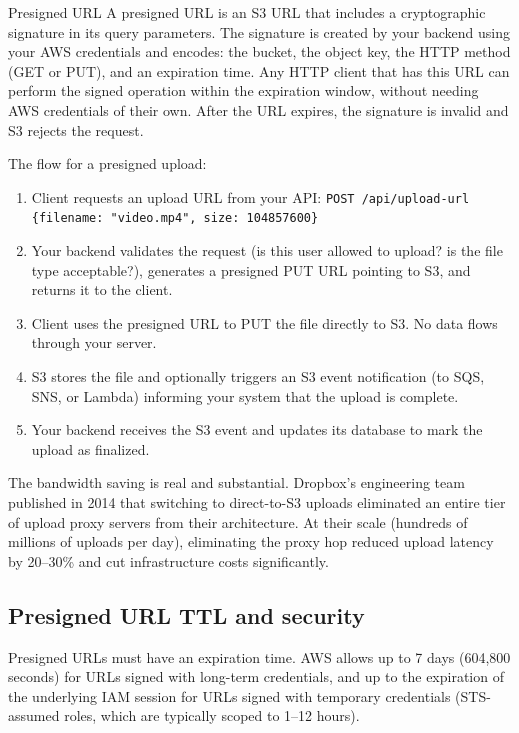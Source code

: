 \documentclass[11pt,a4paper]{article}
\begin{document}
\begin{termbox}{Presigned URL}
A presigned URL is an S3 URL that includes a cryptographic signature in its query parameters. The signature is created by your backend using your AWS credentials and encodes: the bucket, the object key, the HTTP method (GET or PUT), and an expiration time. Any HTTP client that has this URL can perform the signed operation within the expiration window, without needing AWS credentials of their own. After the URL expires, the signature is invalid and S3 rejects the request.
\end{termbox}

The flow for a presigned upload:

\begin{enumerate}[leftmargin=1.5em, itemsep=4pt]
  \item Client requests an upload URL from your API: \texttt{POST /api/upload-url \{filename: "video.mp4", size: 104857600\}}
  \item Your backend validates the request (is this user allowed to upload? is the file type acceptable?), generates a presigned PUT URL pointing to S3, and returns it to the client.
  \item Client uses the presigned URL to PUT the file directly to S3. No data flows through your server.
  \item S3 stores the file and optionally triggers an S3 event notification (to SQS, SNS, or Lambda) informing your system that the upload is complete.
  \item Your backend receives the S3 event and updates its database to mark the upload as finalized.
\end{enumerate}

The bandwidth saving is real and substantial. Dropbox's engineering team published in 2014 that switching to direct-to-S3 uploads eliminated an entire tier of upload proxy servers from their architecture. At their scale (hundreds of millions of uploads per day), eliminating the proxy hop reduced upload latency by 20--30\% and cut infrastructure costs significantly.

\subsection{Presigned URL TTL and security}

Presigned URLs must have an expiration time. AWS allows up to 7 days (604,800 seconds) for URLs signed with long-term credentials, and up to the expiration of the underlying IAM session for URLs signed with temporary credentials (STS-assumed roles, which are typically scoped to 1--12 hours).
\end{document}
